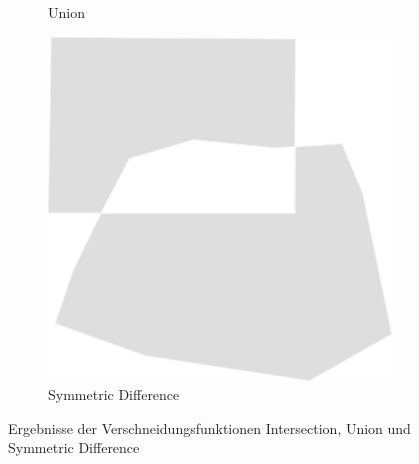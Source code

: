 \documentclass{beamer}
\begin{document}
\begin{frame}
\begin{figure}
\begin{subfigure}{.3\textwidth}
  \caption{Union}
\end{subfigure}
\begin{subfigure}{.3\textwidth}
  \includegraphics[width=.7\linewidth]{../Abbildungen/st_symdifference.png}
  \caption{Symmetric Difference}
\end{subfigure}
\caption{Ergebnisse der Verschneidungsfunktionen Intersection, Union und Symmetric Difference}
\end{figure}
\end{frame}
\end{document}
